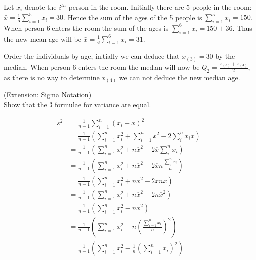 \documentclass[bigtut]{tutorial}\usepackage[]{graphicx}\usepackage[]{color}
\begin{document}
\begin{tutorial}
\begin{questions}
\begin{solution}
Let $x_i$ denote the $i^{th}$ person in the room. Initially there are 5 people in the room:
$\bar{x} =\frac{1}{5}\displaystyle\sum_{i=1}^5 x_i = 30$.
Hence the sum of the ages of the 5 people is $\displaystyle\sum_{i=1}^5 x_i =150$. \\

When person 6 enters the room 
the sum of the ages is $\displaystyle\sum_{i=1}^6 x_i =150+36$. Thus the new mean age will be
$\bar{x}=\frac{1}{6}\displaystyle\sum_{i=1}^6 x_i = 31$. 

\vspace{.5cm}
Order the individuals by age, initially we can deduce that $x_{(3)}=30$ by the median. When person 6 enters the room the median will now be $Q_2=\frac{x_{(3)}+x_{(4)}}{2}$, as there is no 
way to determine $x_{(4)} $ we can not deduce the new median age.
\end{solution}



\question (Extension: Sigma Notation) \\

Show that the 3 formulae for variance are equal.

\begin{solution}
\begin{align*}
s^2  & = \frac{1}{n-1}  \sum_{i=1}^n  (x_{i} -\overline{x} )^{2}      \\
 &= \frac{1}{n-1}  \left(     \sum_{i=1}^n  x_{i} ^2   +  \sum_{i=1}^n \overline{x}^2 - 2 \sum_{i}^n x_{i}\overline{x} \right)   \\
&= \frac{1}{n-1}  \left(     \sum_{i=1}^n  x_{i} ^2   +  n \overline{x}^2 - 2\overline{x} \sum_{i}^n x_{i} \right)   \\
&= \frac{1}{n-1}  \left(     \sum_{i=1}^n  x_{i} ^2   +  n \overline{x}^2 - 2\overline{x}    n \frac{\sum_{i}^n x_{i} }{n}    \right) \\
&= \frac{1}{n-1}  \left(     \sum_{i=1}^n  x_{i} ^2   +  n \overline{x}^2 - 2\overline{x}    n \overline{x}    \right)   \\
&= \frac{1}{n-1}  \left(     \sum_{i=1}^n  x_{i} ^2   +  n \overline{x}^2 - 2n\overline{x}^2       \right)   \\
&= \frac{1}{n-1}  \left(     \sum_{i=1}^n  x_{i} ^2   -  n \overline{x}^2 \right) \nonumber  \\
&= \frac{1}{n-1}  \left(     \sum_{i=1}^n  x_{i} ^2   -  n \left (\frac{\sum_{i=1}^{n} x_{i} }{n} \right)^2   \right)   \\
&= \frac{1}{n-1}  \left(     \sum_{i=1}^n  x_{i} ^2   -  \frac{1}{n} \left (\sum_{i=1}^{n} x_{i} \right)^2   \right)   \\
\end{align*}
\end{solution}
\end{questions}
\end{tutorial}
\end{document}
